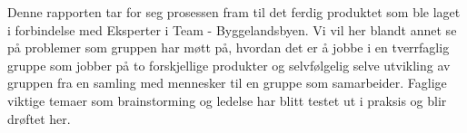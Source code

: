 Denne rapporten tar for seg prosessen fram til det ferdig produktet som ble laget i forbindelse med Eksperter i Team - Byggelandsbyen.
Vi vil her blandt annet se på problemer som gruppen har møtt på, hvordan det er å jobbe i en tverrfaglig gruppe som jobber på to forskjellige produkter og selvfølgelig selve utvikling av gruppen fra en samling med mennesker til en gruppe som samarbeider. 
Faglige viktige temaer som brainstorming og ledelse har blitt testet ut i praksis og blir drøftet her.
